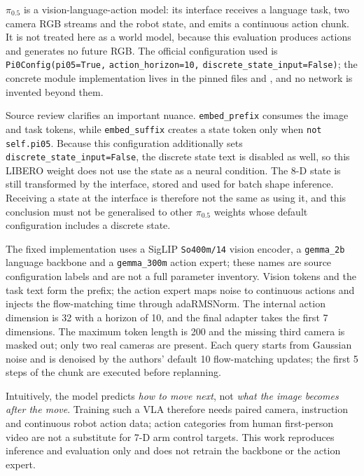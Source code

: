 $\pi_{0.5}$ is a vision-language-action model: its interface receives a language
task, two camera RGB streams and the robot state, and emits a continuous action
chunk. It is not treated here as a world model, because this evaluation produces
actions and generates no future RGB. The official configuration used is
\texttt{Pi0Config(pi05=True,} \texttt{action\_horizon=10,}
\texttt{discrete\_state\_input=False)}; the concrete module implementation lives
in the pinned files  and
, and no network is invented beyond them.

Source review clarifies an important nuance. \texttt{embed\_prefix} consumes the
image and task tokens, while \texttt{embed\_suffix} creates a state token only
when \texttt{not self.pi05}. Because this configuration additionally sets
\texttt{discrete\_state\_input=False}, the discrete state text is disabled as
well, so this LIBERO weight does not use the state as a neural condition. The
8-D state is still transformed by the interface, stored and used for batch
shape inference. Receiving a state at the interface is therefore not the same as
using it, and this conclusion must not be generalised to other $\pi_{0.5}$
weights whose default configuration includes a discrete state.

The fixed implementation uses a SigLIP \texttt{So400m/14} vision encoder, a
\texttt{gemma\_2b} language backbone and a \texttt{gemma\_300m} action expert;
these names are source configuration labels and are not a full parameter
inventory. Vision tokens and the task text form the prefix; the action expert
maps noise to continuous actions and injects the flow-matching time through
adaRMSNorm. The internal action dimension is 32 with a horizon of 10, and the
final adapter takes the first 7 dimensions. The maximum token length is 200 and
the missing third camera is masked out; only two real cameras are present. Each
query starts from Gaussian noise and is denoised by the authors' default 10
flow-matching updates; the first 5 steps of the chunk are executed before
replanning.

Intuitively, the model predicts \emph{how to move next}, not \emph{what the
image becomes after the move}. Training such a VLA therefore needs paired
camera, instruction and continuous robot action data; action categories from
human first-person video are not a substitute for 7-D arm control targets. This
work reproduces inference and evaluation only and does not retrain the backbone
or the action expert.

